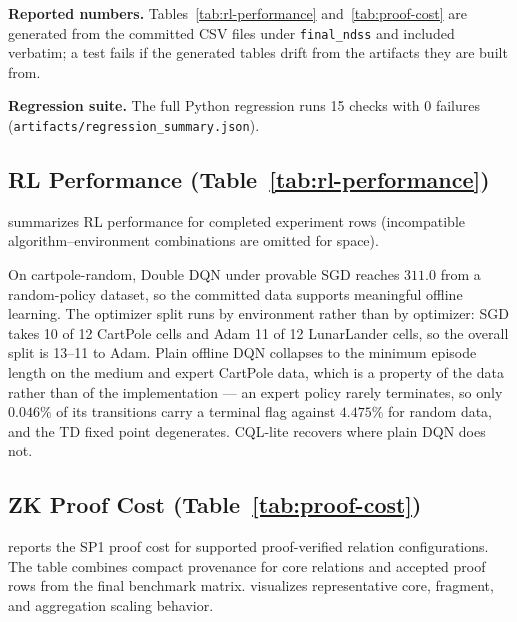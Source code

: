 \textbf{Reported numbers.} Tables~\ref{tab:rl-performance}
and~\ref{tab:proof-cost} are generated from the committed CSV files under
\texttt{final\_ndss} and included verbatim; a test fails if the generated
tables drift from the artifacts they are built from.

\textbf{Regression suite.} The full Python regression runs 15 checks with 0
failures (\texttt{artifacts/regression\_summary.json}).

\subsection{RL Performance (Table~\ref{tab:rl-performance})}

 summarizes RL performance for completed experiment
rows (incompatible algorithm--environment combinations are omitted for space).



On cartpole-random, Double DQN under provable SGD reaches $311.0$ from a
random-policy dataset, so the committed data supports meaningful offline
learning. The optimizer split runs by environment rather than by optimizer:
SGD takes 10 of 12 CartPole cells and Adam 11 of 12 LunarLander cells, so the
overall split is 13--11 to Adam. Plain offline DQN collapses to the minimum episode length on the
medium and expert CartPole data, which is a property of the data rather than of
the implementation --- an expert policy rarely terminates, so only $0.046\%$ of
its transitions carry a terminal flag against $4.475\%$ for random data, and
the TD fixed point degenerates. CQL-lite recovers where plain DQN does not.

\subsection{ZK Proof Cost (Table~\ref{tab:proof-cost})}

 reports the SP1 proof cost for supported proof-verified
relation configurations. The table combines compact provenance for core
relations and accepted proof rows from the final benchmark matrix.
 visualizes representative core, fragment, and
aggregation scaling behavior.



